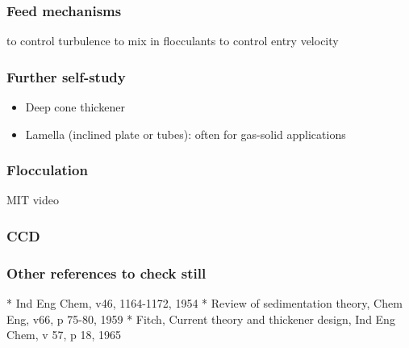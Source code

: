 \begin{frame}\frametitle{Feed mechanisms}
	to control turbulence
	to mix in flocculants
	to control entry velocity
\end{frame}

\begin{frame}\frametitle{Further self-study}
	\begin{itemize}
		\item	Deep cone thickener
		\item	Lamella (inclined plate or tubes): often for gas-solid applications 
				\vspace{12pt}
	\end{itemize}
\end{frame}

\begin{frame}\frametitle{Flocculation}
	MIT video
\end{frame}

\begin{frame}\frametitle{CCD}
	
\end{frame}

\begin{frame}\frametitle{Other references to check still}
	* Ind Eng Chem, v46, 1164-1172, 1954
	* Review of sedimentation theory, Chem Eng, v66, p 75-80, 1959
	* Fitch, Current theory and thickener design, Ind Eng Chem, v 57, p 18, 1965
	
\end{frame}